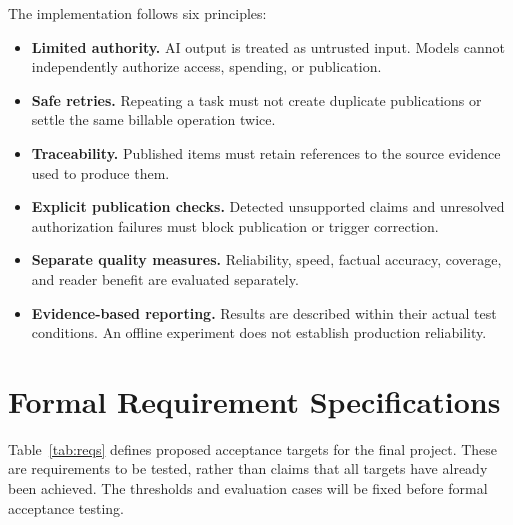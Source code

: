 The implementation follows six principles:

\begin{itemize}
    \item \textbf{Limited authority.}
    AI output is treated as untrusted input. Models cannot independently authorize access, spending, or publication.

    \item \textbf{Safe retries.}
    Repeating a task must not create duplicate publications or settle the same billable operation twice.

    \item \textbf{Traceability.}
    Published items must retain references to the source evidence used to produce them.

    \item \textbf{Explicit publication checks.}
    Detected unsupported claims and unresolved authorization failures must block publication or trigger correction.

    \item \textbf{Separate quality measures.}
    Reliability, speed, factual accuracy, coverage, and reader benefit are evaluated separately.

    \item \textbf{Evidence-based reporting.}
    Results are described within their actual test conditions. An offline experiment does not establish production reliability.
\end{itemize}

\section{Formal Requirement Specifications}

Table~\ref{tab:reqs} defines proposed acceptance targets for the final project. These are requirements to be tested, rather than claims that all targets have already been achieved. The thresholds and evaluation cases will be fixed before formal acceptance testing.

